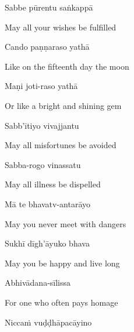 Sabbe pūrentu saṅkappā

\begin{english}
  May all your wishes be fulfilled
\end{english}

Cando paṇṇaraso yathā

\begin{english}
  Like on the fifteenth day the moon
\end{english}

Maṇi joti-raso yathā\hyperlink{endnote116-appendix}{\hypertarget{endnote116-body}{}}

\begin{english}
  Or like a bright and shining gem\\
\end{english}

Sabb'ītiyo vivajjantu\hyperlink{endnote117-appendix}{\hypertarget{endnote117-body}{}}

\begin{english}
  May all misfortunes be avoided
\end{english}

Sabba-rogo vinassatu

\begin{english}
  May all illness be dispelled
\end{english}

Mā te bhavatv-antarāyo

\begin{english}
  May you never meet with dangers
\end{english}

Sukhī dīgh'āyuko bhava

\begin{english}
  May you be happy and live long
\end{english}

Abhivādana-sīlissa

\begin{english}
  For one who often pays homage
\end{english}

Niccaṁ vuḍḍhāpacāyino

